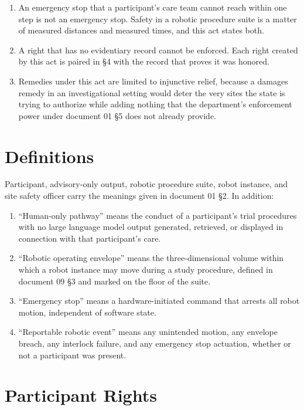 \begin{enumerate}
\item An emergency stop that a participant's care team cannot reach within one
  step is not an emergency stop. Safety in a robotic procedure suite is a matter
  of measured distances and measured times, and this act states both.

\item A right that has no evidentiary record cannot be enforced. Each right
  created by this act is paired in §4 with the record that proves it was
  honored.

\item Remedies under this act are limited to injunctive relief, because a
  damages remedy in an investigational setting would deter the very sites the
  state is trying to authorize while adding nothing that the department's
  enforcement power under document 01 §5 does not already provide.
\end{enumerate}

\section{Definitions}

Participant, advisory-only output, robotic procedure suite, robot instance, and
site safety officer carry the meanings given in document 01 §2. In addition:

\begin{enumerate}
\item ``Human-only pathway'' means the conduct of a participant's trial
  procedures with no large language model output generated, retrieved, or
  displayed in connection with that participant's care.

\item ``Robotic operating envelope'' means the three-dimensional volume within
  which a robot instance may move during a study procedure, defined in document
  09 §3 and marked on the floor of the suite.

\item ``Emergency stop'' means a hardware-initiated command that arrests all
  robot motion, independent of software state.

\item ``Reportable robotic event'' means any unintended motion, any envelope
  breach, any interlock failure, and any emergency stop actuation, whether or
  not a participant was present.
\end{enumerate}

\section{Participant Rights}

